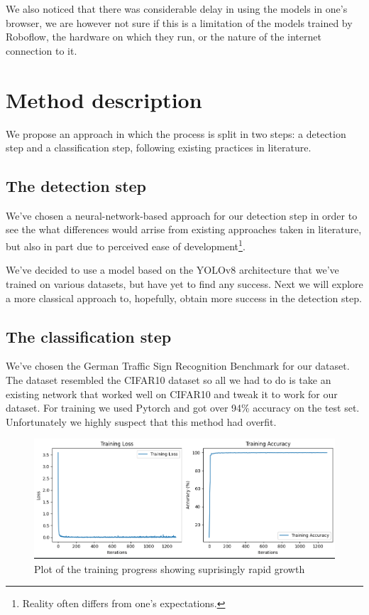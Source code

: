 \documentclass[conference]{IEEEtran}
\begin{document}
We also noticed that there was considerable delay in using the models in one's browser, we are however
not sure if this is a limitation of the models trained by Roboflow, the hardware on which they run, or
the nature of the internet connection to it.


\section{Method description}

We propose an approach in which the process is split in two steps: a detection step and a
classification step, following existing practices in literature.

\subsection{The detection step}

We've chosen a neural-network-based approach for our detection step in order to see the
what differences would arrise from existing approaches taken in literature, but also in
part due to perceived ease of development\footnote{Reality often differs from one's
expectations.}.

We've decided to use a model based on the YOLOv8 architecture that we've trained on various
datasets, but have yet to find any success. Next we will explore a more classical approach
to, hopefully, obtain more success in the detection step.

\subsection{The classification step}

We've chosen the German Traffic Sign Recognition Benchmark\cite{Houben-IJCNN-2013} for our dataset.
The dataset resembled the CIFAR10 dataset so all we had to do is take an existing network
that worked well on CIFAR10 and tweak it to work for our dataset. For training we used
Pytorch and got over 94\% accuracy on the test set. Unfortunately we highly suspect that
this method had overfit.
\begin{figure}
    \centerline{\includegraphics[width=\linewidth,]{overfit}}
    \caption{Plot of the training progress showing suprisingly rapid growth}
\end{figure}
\end{document}
